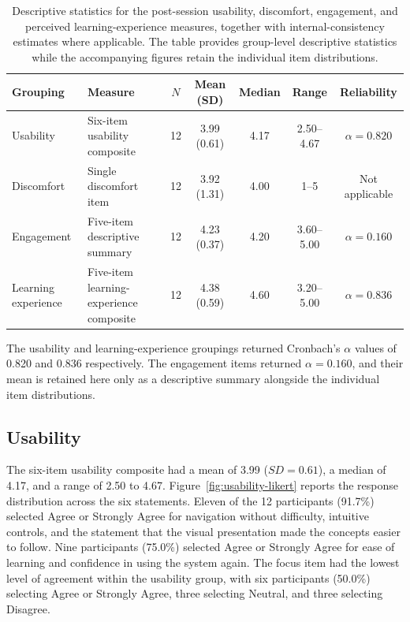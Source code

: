 \begin{table}[!htbp]
\centering
\small
\renewcommand{\arraystretch}{1.1}
\begin{tabularx}{\textwidth}{>{\raggedright\arraybackslash}p{3.3cm} >{\raggedright\arraybackslash}X c c c c c}
\toprule
Grouping & Measure & $N$ & Mean (SD) & Median & Range & Reliability \\
\midrule
Usability & Six-item usability composite & 12 & 3.99 (0.61) & 4.17 & 2.50--4.67 & $\alpha = 0.820$ \\
Discomfort & Single discomfort item & 12 & 3.92 (1.31) & 4.00 & 1--5 & Not applicable \\
Engagement & Five-item descriptive summary & 12 & 4.23 (0.37) & 4.20 & 3.60--5.00 & $\alpha = 0.160$ \\
Learning experience & Five-item learning-experience composite & 12 & 4.38 (0.59) & 4.60 & 3.20--5.00 & $\alpha = 0.836$ \\
\bottomrule
\end{tabularx}
\caption[Questionnaire descriptive summary]{Descriptive statistics for the post-session usability, discomfort, engagement, and perceived learning-experience measures, together with internal-consistency estimates where applicable. The table provides group-level descriptive statistics while the accompanying figures retain the individual item distributions.}
\label{tab:questionnaire-descriptives}
\end{table}

The usability and learning-experience groupings returned Cronbach's $\alpha$ values of 0.820 and 0.836 respectively. The engagement items returned $\alpha=0.160$, and their mean is retained here only as a descriptive summary alongside the individual item distributions.

\subsection{Usability}

The six-item usability composite had a mean of 3.99 ($SD=0.61$), a median of 4.17, and a range of 2.50 to 4.67. Figure~\ref{fig:usability-likert} reports the response distribution across the six statements. Eleven of the 12 participants (91.7\%) selected Agree or Strongly Agree for navigation without difficulty, intuitive controls, and the statement that the visual presentation made the concepts easier to follow. Nine participants (75.0\%) selected Agree or Strongly Agree for ease of learning and confidence in using the system again. The focus item had the lowest level of agreement within the usability group, with six participants (50.0\%) selecting Agree or Strongly Agree, three selecting Neutral, and three selecting Disagree.

